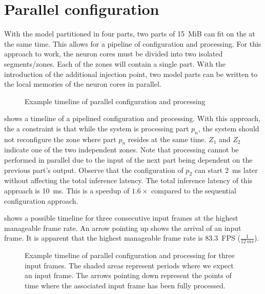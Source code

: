 \section{Parallel configuration}
With the model partitioned in four parts, two parts of \SI{15}{MiB} can fit on the \graicore{} at the same time.
This allows for a pipeline of configuration and processing.
For this approach to work, the neuron cores must be divided into two isolated segments/zones.
Each of the zones will contain a single part.
With the introduction of the additional injection point, two model parts can be written to the local memories of the neuron cores in parallel.

\begin{figure}[hbtp]
    \centering
    \resizebox{0.65\linewidth}{!}{
        
    }
    \caption{Example timeline of parallel configuration and processing}
    \label{fig:schedule_parallel_configuration}
\end{figure}

 shows a timeline of a pipelined configuration and processing.
With this approach, the a constraint is that while the system is processing part $p_n$, the system should not reconfigure the zone where part $p_n$ resides at the same time.
$Z_1$ and $Z_2$ indicate one of the two independent zones.
Note that processing cannot be performed in parallel due to the input of the next part being dependent on the previous part's output.
Observe that the configuration of $p_2$ can start \SI{2}{ms} later without affecting the total inference latency.
The total inference latency of this approach is \SI{10}{ms}.
This is a speedup of $1.6\times$ compared to the sequential configuration approach.

 shows a possible timeline for three consecutive input frames at the highest manageable frame rate.
An arrow pointing up shows the arrival of an input frame.
It is apparent that the highest manageable frame rate is \SI{83.3}{FPS} ($\frac{1}{\SI{12}{ms}}$).

\begin{figure}[hbtp]
    \centering
    \resizebox{0.8\linewidth}{!}{
        
    }
    \caption{
    Example timeline of parallel configuration and processing for three input frames.
    The shaded areas represent periods where we expect an input frame.
    The arrows pointing down represent the points of time where the associated input frame has been fully processed.
    }
    \label{fig:schedule_parallel_configuration_extended}
\end{figure}

